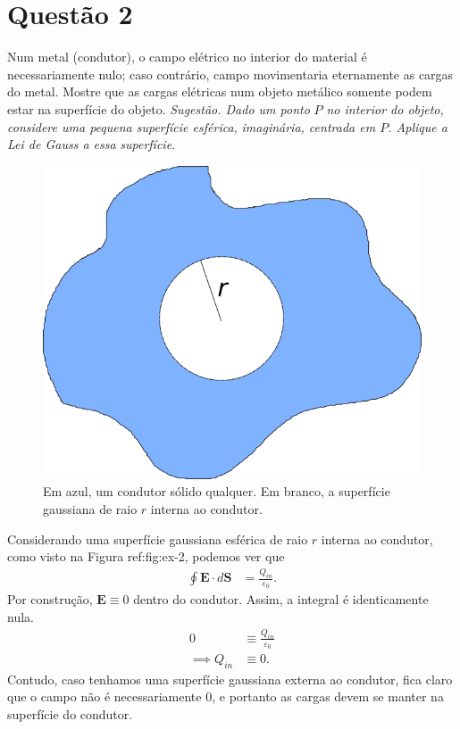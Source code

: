 \documentclass[11pt]{article}
\begin{document}
\section{Questão 2}
\label{sec:org2023f6f}
Num metal (condutor), o campo elétrico no interior do material é
necessariamente nulo; caso contrário, campo movimentaria eternamente as
cargas do metal. Mostre que as cargas elétricas num objeto metálico
somente podem estar na superfície do objeto. \emph{Sugestão. Dado um ponto}
\emph{\(P\) no interior do objeto, considere uma pequena superfície esférica,}
\emph{imaginária, centrada em \(P\). Aplique a Lei de Gauss a essa}
\emph{superfície.}

\begin{figure}[h!]
  \centering
  \includegraphics[scale=0.3]{imagens/ex-2.png}
  \caption{Em azul, um condutor sólido qualquer. Em branco, a
    superfície gaussiana de raio $r$ interna ao condutor. }
  \label{fig:ex-2}
\end{figure}

Considerando uma superfície gaussiana esférica de raio \(r\) interna ao
condutor, como visto na Figura ref:fig:ex-2, podemos ver que 
\begin{align*}
  \oint \mathbf E\cdot d\mathbf S &= \frac{Q_{in}}{\varepsilon_0}.
\end{align*}
Por construção, $\mathbf E \equiv 0$ dentro do condutor. Assim, a integral
é identicamente nula. 
\begin{align*}
  0 &\equiv \frac{Q_{in}}{\varepsilon_0}\\
  \implies Q_{in} &\equiv 0.
\end{align*}
Contudo, caso tenhamos uma superfície gaussiana externa ao condutor,
fica claro que o campo não é necessariamente \(0\), e portanto as cargas
devem se manter na superfície do condutor. 
\end{document}
